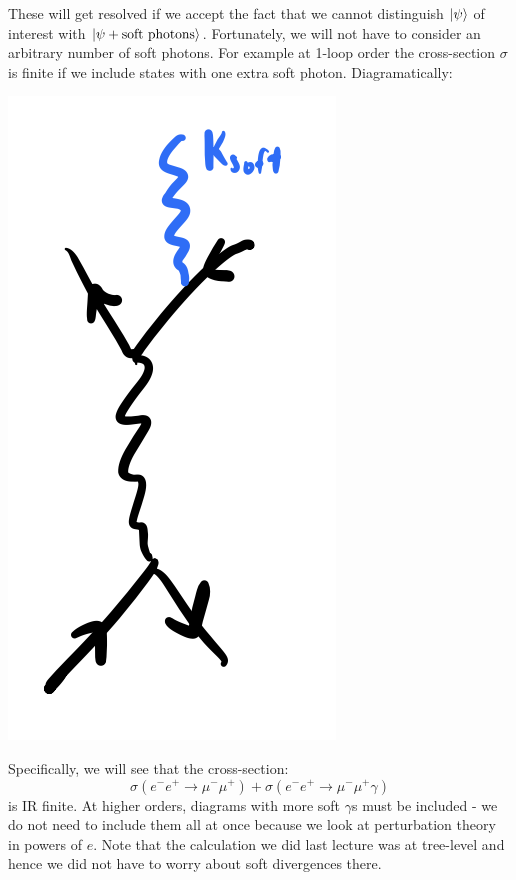 These will get resolved if we accept the fact that we cannot distinguish $\lvert \psi \rangle$ of interest with $\lvert \psi + \text{soft photons} \rangle$. Fortunately, we will not have to consider an arbitrary number of soft photons. For example at 1-loop order the cross-section $\sigma$ is finite if we include states with one extra soft photon. Diagramatically:

\begin{center}
    \includegraphics[scale=0.35]{Lectures/Images/lec14-singlesoft.png}
\end{center}

Specifically, we will see that the cross-section:
\begin{equation}
    \sigma(e^-e^+ \to \mu^-\mu^+) + \sigma(e^-e^+ \to \mu^-\mu^+\gamma)
\end{equation}
is IR finite. At higher orders, diagrams with more soft $\gamma$s must be included - we do not need to include them all at once because we look at perturbation theory in powers of $e$. Note that the calculation we did last lecture was at tree-level and hence we did not have to worry about soft divergences there.

